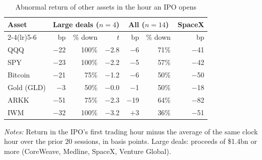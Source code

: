 \begin{table}[!htbp]\centering\small
\caption{Abnormal return of other assets in the hour an IPO opens}\label{tab:hour}

\begin{threeparttable}
\begin{tabular}{lrrrrrr}
\toprule
Asset & \multicolumn{3}{c}{Large deals ($n=4$)} & \multicolumn{2}{c}{All ($n=14$)} & SpaceX \\ \cmidrule(lr){2-4}\cmidrule(lr){5-6} & bp & \% down & $t$ & bp & \% down & bp \\
\midrule
QQQ & $-$22 & 100\% & $-$2.8 & $-$6 & 71\% & $-$41 \\
SPY & $-$23 & 100\% & $-$2.2 & $-$5 & 57\% & $-$42 \\
Bitcoin & $-$21 & 75\% & $-$1.2 & $-$6 & 50\% & $-$50 \\
Gold (GLD) & $-$3 & 50\% & $-$0.0 & $-$1 & 50\% & $-$18 \\
ARKK & $-$51 & 75\% & $-$2.3 & $-$19 & 64\% & $-$82 \\
IWM & $-$32 & 100\% & $-$3.2 & $+$3 & 36\% & $-$51 \\
\bottomrule
\end{tabular}
\begin{tablenotes}[flushleft]\footnotesize
\item \textit{Notes:} Return in the IPO's first trading hour minus the average of the same clock hour over the prior 20 sessions, in basis points. Large deals: proceeds of \$1.4bn or more (CoreWeave, Medline, SpaceX, Venture Global).
\end{tablenotes}
\end{threeparttable}

\end{table}
